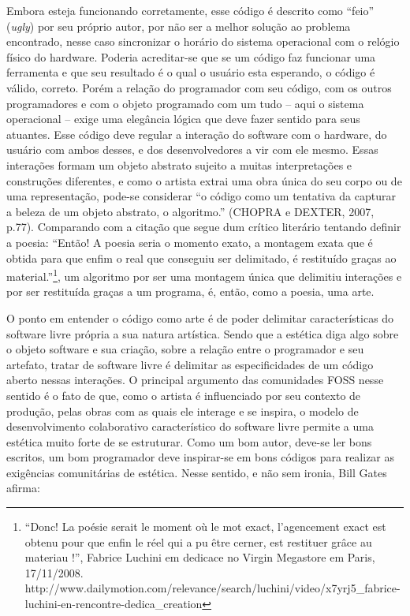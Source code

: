 Embora esteja funcionando corretamente, esse código é descrito como “feio” (\emph{ugly}) por seu próprio autor, por não ser a melhor solução ao problema encontrado, nesse caso sincronizar o horário do sistema operacional com o relógio físico do hardware. Poderia acreditar-se que se um código faz funcionar uma ferramenta e que seu resultado é o qual o usuário esta esperando, o código é válido, correto. Porém a relação do programador com seu código, com os outros programadores e com o objeto programado com um tudo – aqui o sistema operacional – exige uma elegância lógica que deve fazer sentido para seus atuantes. Esse código deve regular a interação do software com o hardware, do usuário com ambos desses, e dos desenvolvedores a vir com ele mesmo. Essas interações formam um objeto abstrato sujeito a muitas interpretações e construções diferentes, e como o artista extrai uma obra única do seu corpo ou de uma representação, pode-se considerar “o código como um tentativa da capturar a beleza de um objeto abstrato, o algoritmo.” (CHOPRA e DEXTER, 2007, p.77). Comparando com a citação que segue dum crítico literário tentando definir a poesia: “Então! A poesia seria o momento exato, a montagem exata que é obtida para que enfim o real que conseguiu ser delimitado, é restituído graças ao material.”\footnote{“Donc! La poésie serait le moment où le mot exact, l'agencement exact est obtenu pour que enfin le réel qui a pu être cerner, est restituer grâce au materiau !”, Fabrice Luchini em dedicace no Virgin Megastore em Paris, 17/11/2008. http://www.dailymotion.com/relevance/search/luchini/video/x7yrj5\_fabrice-luchini-en-rencontre-dedica\_creation}, um algoritmo por ser uma montagem única que delimitiu interações e por ser restituída graças a um programa, é, então, como a poesia, uma arte.

O ponto em entender o código como arte é de poder delimitar características do software livre própria a sua natura artística. Sendo que a estética diga algo sobre o objeto software e sua criação, sobre a relação entre o programador e seu artefato, tratar de software livre é delimitar as especificidades de um código aberto nessas interações. O principal argumento das comunidades FOSS nesse sentido é o fato de que, como o artista é influenciado por seu contexto de produção, pelas obras com as quais ele interage e se inspira, o modelo de desenvolvimento colaborativo característico do software livre permite a uma estética muito forte de se estruturar. Como um bom autor, deve-se ler bons escritos, um bom programador deve inspirar-se em bons códigos para realizar as exigências comunitárias de estética. Nesse sentido, e não sem ironia, Bill Gates afirma:

